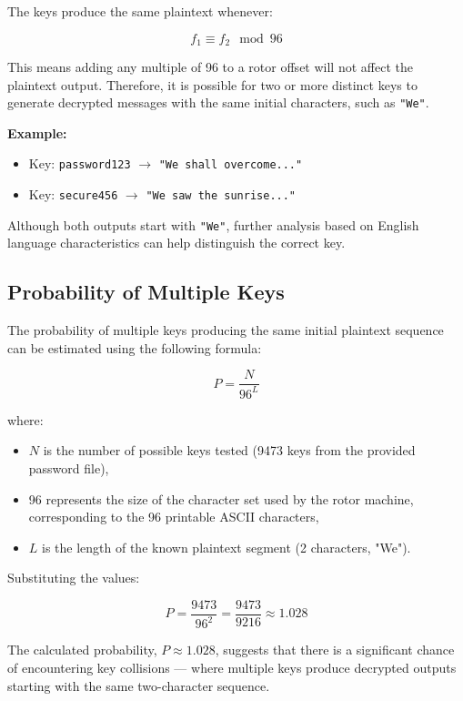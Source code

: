 \documentclass{article}
\begin{document}
The keys produce the same plaintext whenever:

\[
f_1 \equiv f_2 \mod 96
\]

This means adding any multiple of 96 to a rotor offset will not affect the plaintext output. Therefore, it is possible for two or more distinct keys to generate decrypted messages with the same initial characters, such as \texttt{"We"}.



\textbf{Example:}
\begin{itemize}
    \item Key: \texttt{password123} $\rightarrow$ \texttt{"We shall overcome..."}
    \item Key: \texttt{secure456} $\rightarrow$ \texttt{"We saw the sunrise..."}
\end{itemize}

Although both outputs start with \texttt{"We"}, further analysis based on English language characteristics can help distinguish the correct key.

\subsection{Probability of Multiple Keys}
The probability of multiple keys producing the same initial plaintext sequence can be estimated using the following formula:

\begin{equation}
    P = \frac{N}{96^L}
\end{equation}

where:
\begin{itemize}
    \item \( N \) is the number of possible keys tested (9473 keys from the provided password file),
    \item 96 represents the size of the character set used by the rotor machine, corresponding to the 96 printable ASCII characters,
    \item \( L \) is the length of the known plaintext segment (2 characters, "We").
\end{itemize}

Substituting the values:

\begin{equation}
    P = \frac{9473}{96^2} = \frac{9473}{9216} \approx 1.028
\end{equation}

The calculated probability, \( P \approx 1.028 \), suggests that there is a significant chance of encountering key collisions — where multiple keys produce decrypted outputs starting with the same two-character sequence.
\end{document}
